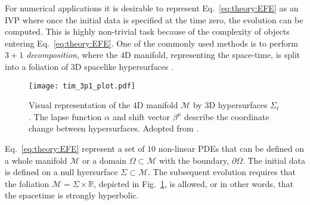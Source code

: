 For numerical applications it is desirable to represent Eq.~\eqref{eq:theory:EFE} 
as an \ac{IVP} where once the initial data is specified at the time zero, 
the evolution can be computed. 
This is highly non-trivial task because of the complexity of objects entering 
Eq.~\eqref{eq:theory:EFE}. One of the commonly used methods is to perform 
\textit{$3+1$ decomposition}, where the $4$D manifold, representing the space-time, 
is split into a foliation of $3$D spacelike hypersurfaces 
\citep{Alcubierre:2008,Baumgarte:2010,Gourgoulhon:2007ue,Rezzolla:2013}.


\begin{figure}[t]
    \centering 
    \texttt{[image: tim\_3p1\_plot.pdf]}
    \caption{
        Visual representation of the $4$D manifold $\mathcal{M}$ by $3$D hypersurfaces 
        $\Sigma_t$. The lapse function $\alpha$ and shift vector $\beta^{\mu}$ describe the 
        coordinate change between hypersurfaces.
        Adopted from \citet{Dietrich:2016phd}.
    }
    \label{fig:theory:3p1}
\end{figure}

Eq.~\eqref{eq:theory:EFE} represent a set of $10$ non-linear \acp{PDE} 
that can be defined on a whole manifold $\mathcal{M}$ or a domain $\Omega\subset\mathcal{M}$ 
with the boundary, $\partial\Omega$.%
%
The initial data is defined on a null hyersurface $\Sigma\subset\mathcal{M}$. 
The subsequent evolution requires that the foliation 
$\mathcal{M}=\Sigma\times\mathbb{R}$, depicted in Fig.~\ref{fig:theory:3p1}, 
is allowed, or in other words, that the spacetime is strongly hyperbolic. 
%



